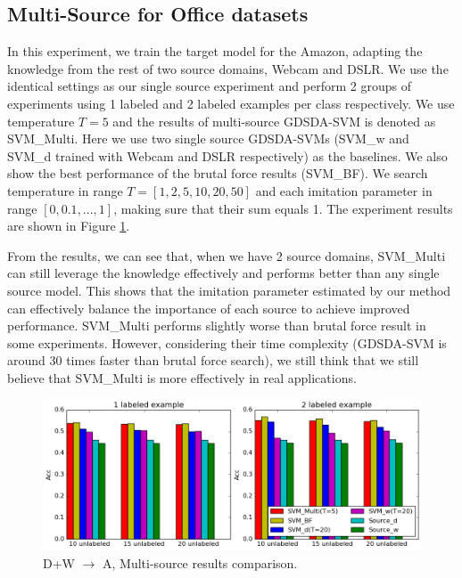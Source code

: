 \subsection{Multi-Source for Office datasets}
In this experiment, we train the target model for the Amazon, adapting the knowledge from the rest of two source domains, Webcam and DSLR.
We use the identical settings as our single source experiment and perform 2 groups of experiments using 1 labeled and 2 labeled examples per class respectively. We use temperature $T=5$ and the results of multi-source GDSDA-SVM is denoted as SVM\_Multi. Here we use two single source GDSDA-SVMs (SVM\_w and SVM\_d trained with Webcam and DSLR respectively) as the baselines. We also show the best performance of the brutal force results (SVM\_BF). We search temperature in range $T=[1,2,5,10,20,50]$ and each imitation parameter in range $[0,0.1,...,1]$, making sure that their sum equals 1. The experiment results are shown in Figure \ref{fig:multi}.

From the results, we can see that, when we have 2 source domains, SVM\_Multi can still leverage the knowledge effectively and performs better than any single source model. This shows that the imitation parameter estimated by our method can effectively balance the importance of each source to achieve improved performance. SVM\_Multi performs slightly worse than brutal force result in some experiments. However, considering their time complexity (GDSDA-SVM is around 30 times faster than brutal force search), we still think that we still believe that SVM\_Multi is more effectively in real applications.
\begin{figure}
\centering
\includegraphics[scale=.3]{figure/cmp.png}
\caption{D+W $\rightarrow$ A, Multi-source results comparison.}\label{fig:multi}
\end{figure}



